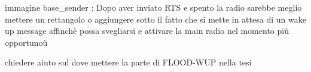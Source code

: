 immagine base\_sender : Dopo aver inviato RTS e spento la radio sarebbe meglio mettere un rettangolo o aggiungere sotto il fatto che si mette in attesa di un wake up message affinchè possa svegliarsi e attivare la main radio nel momento più opportunoù

chiedere aiuto sul dove mettere la parte di FLOOD-WUP nella tesi